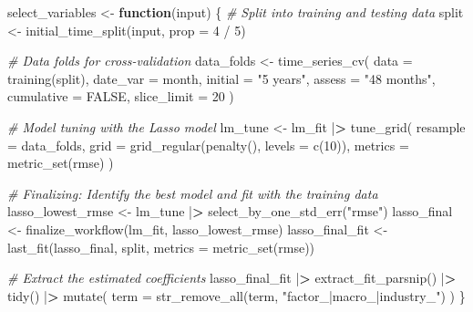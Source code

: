\documentclass[
]{book}
\newenvironment{Shaded}{\begin{snugshade}}{\end{snugshade}}
\newcommand{\AttributeTok}[1]{\textcolor[rgb]{0.61,0.61,0.61}{#1}}
\newcommand{\CommentTok}[1]{\textcolor[rgb]{0.37,0.37,0.37}{\textit{#1}}}
\newcommand{\ConstantTok}[1]{\textcolor[rgb]{0,0,0}{#1}}
\newcommand{\ControlFlowTok}[1]{\textcolor[rgb]{0.27,0.27,0.27}{\textbf{#1}}}
\newcommand{\DecValTok}[1]{\textcolor[rgb]{0.06,0.06,0.06}{#1}}
\newcommand{\ErrorTok}[1]{\textcolor[rgb]{0.14,0.14,0.14}{\textbf{#1}}}
\newcommand{\FunctionTok}[1]{\textcolor[rgb]{0,0,0}{#1}}
\newcommand{\NormalTok}[1]{#1}
\newcommand{\OtherTok}[1]{\textcolor[rgb]{0.37,0.37,0.37}{#1}}
\newcommand{\SpecialCharTok}[1]{\textcolor[rgb]{0,0,0}{#1}}
\newcommand{\StringTok}[1]{\textcolor[rgb]{0.5,0.5,0.5}{#1}}
\begin{document}
\begin{Shaded}
\begin{Highlighting}[]
\NormalTok{select\_variables }\OtherTok{\textless{}{-}} \ControlFlowTok{function}\NormalTok{(input) \{}
  \CommentTok{\# Split into training and testing data}
\NormalTok{  split }\OtherTok{\textless{}{-}} \FunctionTok{initial\_time\_split}\NormalTok{(input, }\AttributeTok{prop =} \DecValTok{4} \SpecialCharTok{/} \DecValTok{5}\NormalTok{)}

  \CommentTok{\# Data folds for cross{-}validation}
\NormalTok{  data\_folds }\OtherTok{\textless{}{-}} \FunctionTok{time\_series\_cv}\NormalTok{(}
    \AttributeTok{data =} \FunctionTok{training}\NormalTok{(split),}
    \AttributeTok{date\_var =}\NormalTok{ month,}
    \AttributeTok{initial =} \StringTok{"5 years"}\NormalTok{,}
    \AttributeTok{assess =} \StringTok{"48 months"}\NormalTok{,}
    \AttributeTok{cumulative =} \ConstantTok{FALSE}\NormalTok{,}
    \AttributeTok{slice\_limit =} \DecValTok{20}
\NormalTok{  )}

  \CommentTok{\# Model tuning with the Lasso model}
\NormalTok{  lm\_tune }\OtherTok{\textless{}{-}}\NormalTok{ lm\_fit }\SpecialCharTok{|}\ErrorTok{\textgreater{}}
    \FunctionTok{tune\_grid}\NormalTok{(}
      \AttributeTok{resample =}\NormalTok{ data\_folds,}
      \AttributeTok{grid =} \FunctionTok{grid\_regular}\NormalTok{(}\FunctionTok{penalty}\NormalTok{(), }\AttributeTok{levels =} \FunctionTok{c}\NormalTok{(}\DecValTok{10}\NormalTok{)),}
      \AttributeTok{metrics =} \FunctionTok{metric\_set}\NormalTok{(rmse)}
\NormalTok{    )}

  \CommentTok{\# Finalizing: Identify the best model and fit with the training data}
\NormalTok{  lasso\_lowest\_rmse }\OtherTok{\textless{}{-}}\NormalTok{ lm\_tune }\SpecialCharTok{|}\ErrorTok{\textgreater{}} \FunctionTok{select\_by\_one\_std\_err}\NormalTok{(}\StringTok{"rmse"}\NormalTok{)}
\NormalTok{  lasso\_final }\OtherTok{\textless{}{-}} \FunctionTok{finalize\_workflow}\NormalTok{(lm\_fit, lasso\_lowest\_rmse)}
\NormalTok{  lasso\_final\_fit }\OtherTok{\textless{}{-}} \FunctionTok{last\_fit}\NormalTok{(lasso\_final, split, }\AttributeTok{metrics =} \FunctionTok{metric\_set}\NormalTok{(rmse))}

  \CommentTok{\# Extract the estimated coefficients}
\NormalTok{  lasso\_final\_fit }\SpecialCharTok{|}\ErrorTok{\textgreater{}}
    \FunctionTok{extract\_fit\_parsnip}\NormalTok{() }\SpecialCharTok{|}\ErrorTok{\textgreater{}}
    \FunctionTok{tidy}\NormalTok{() }\SpecialCharTok{|}\ErrorTok{\textgreater{}}
    \FunctionTok{mutate}\NormalTok{(}
      \AttributeTok{term =} \FunctionTok{str\_remove\_all}\NormalTok{(term, }\StringTok{"factor\_|macro\_|industry\_"}\NormalTok{)}
\NormalTok{    )}
\NormalTok{\}}


\end{Highlighting}
\end{Shaded}
\end{document}
